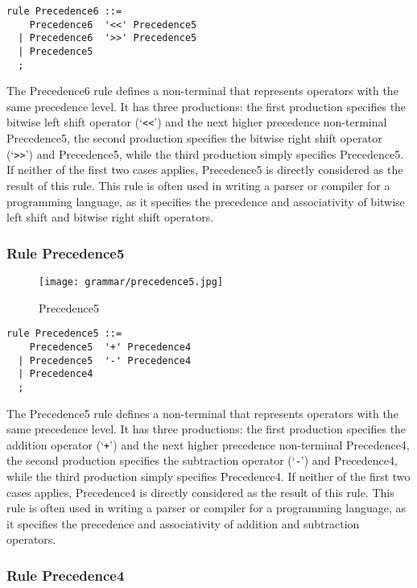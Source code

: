 \begin{lstlisting}
rule Precedence6 ::=
    Precedence6  '<<' Precedence5 
  | Precedence6  '>>' Precedence5 
  | Precedence5 
  ;
\end{lstlisting}

The Precedence6 rule defines a non-terminal that represents operators with the same precedence level. It has three productions: the first production specifies the bitwise left shift operator (`\verb|<<|') and the next higher precedence non-terminal Precedence5, the second production specifies the bitwise right shift operator (`\verb|>>|') and Precedence5, while the third production simply specifies Precedence5. If neither of the first two cases applies, Precedence5 is directly considered as the result of this rule. This rule is often used in writing a parser or compiler for a programming language, as it specifies the precedence and associativity of bitwise left shift and bitwise right shift operators.

\subsubsection*{Rule Precedence5}

\begin{figure}[!ht]
\centering
\texttt{[image: grammar/precedence5.jpg]}
\caption{Precedence5}
\end{figure}

\begin{lstlisting}
rule Precedence5 ::=
    Precedence5  '+' Precedence4 
  | Precedence5  '-' Precedence4 
  | Precedence4 
  ;
\end{lstlisting}

The Precedence5 rule defines a non-terminal that represents operators with the same precedence level. It has three productions: the first production specifies the addition operator (`\verb|+|') and the next higher precedence non-terminal Precedence4, the second production specifies the subtraction operator (`\verb|-|') and Precedence4, while the third production simply specifies Precedence4. If neither of the first two cases applies, Precedence4 is directly considered as the result of this rule. This rule is often used in writing a parser or compiler for a programming language, as it specifies the precedence and associativity of addition and subtraction operators.

\subsubsection*{Rule Precedence4}

